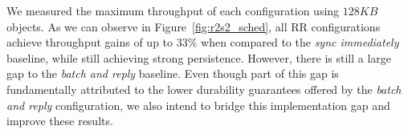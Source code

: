 We measured the maximum throughput of each configuration using  $128KB$ objects.
As we can observe in Figure~\ref{fig:r2s2_sched}, all \ac{RR}
configurations achieve throughput gains of up to $33\%$ when compared to the
\emph{sync immediately} baseline, while still achieving strong
persistence. However, there is still a large gap to the
\emph{batch and reply} baseline. Even though part of this gap is fundamentally attributed to the
lower durability guarantees offered by the \emph{batch and reply}
configuration, we also intend to bridge this implementation gap and
improve these results.
